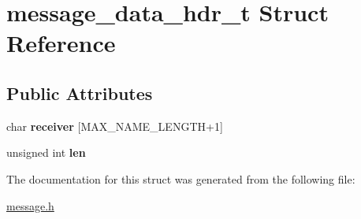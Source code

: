 \hypertarget{structmessage__data__hdr__t}{}\section{message\+\_\+data\+\_\+hdr\+\_\+t Struct Reference}
\label{structmessage__data__hdr__t}
\subsection*{Public Attributes}
\begin{DoxyCompactItemize}
\item 
char {\bfseries receiver} \mbox{[}M\+A\+X\+\_\+\+N\+A\+M\+E\+\_\+\+L\+E\+N\+G\+TH+1\mbox{]}\hypertarget{structmessage__data__hdr__t_af6c7df81f506cf337ac5e7948fc3a665}{}\label{structmessage__data__hdr__t_af6c7df81f506cf337ac5e7948fc3a665}

\item 
unsigned int {\bfseries len}\hypertarget{structmessage__data__hdr__t_a4b5503aa5aa13262ce9a702f61176579}{}\label{structmessage__data__hdr__t_a4b5503aa5aa13262ce9a702f61176579}

\end{DoxyCompactItemize}


The documentation for this struct was generated from the following file\+:\begin{DoxyCompactItemize}
\item 
\hyperlink{message_8h}{message.\+h}\end{DoxyCompactItemize}
